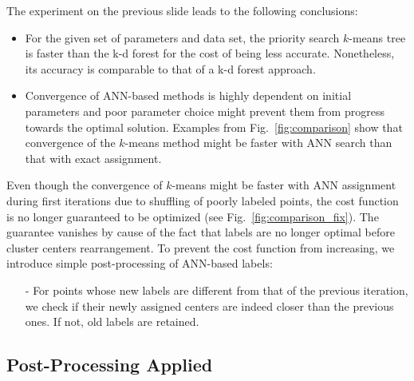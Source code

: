 \begin{frame}
	The experiment on the previous slide leads to the following conclusions:
	
	\begin{itemize}
		\item For the given set of parameters and data set, the priority search $k$-means tree is faster than the k-d forest for the cost of being less accurate. Nonetheless, its accuracy is comparable to that of a k-d forest approach.
		\item Convergence of ANN-based methods is highly dependent on initial parameters and poor parameter choice might prevent them from progress towards the optimal solution. Examples from Fig.~\ref{fig:comparison} show that convergence of the $k$-means method might be faster with ANN search than that with exact assignment.
	\end{itemize}
	
	Even though the convergence of $k$-means might be faster with ANN assignment during first iterations due to shuffling of poorly labeled points, the cost function is no longer guaranteed to be optimized (see Fig.~\ref{fig:comparison_fix}). The guarantee vanishes by cause of the fact that labels are no longer optimal before cluster centers rearrangement. To prevent the cost function from increasing, we introduce simple post-processing of ANN-based labels:
	
	\begin{itemize}
		\item[-] For points whose new labels are different from that of the previous iteration, we check if their newly assigned centers are indeed closer than the previous ones. If not, old labels are retained. 
	\end{itemize}
\end{frame}


\subsection{Post-Processing Applied}

